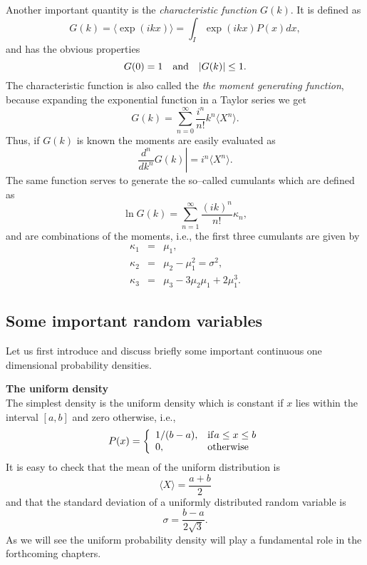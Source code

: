 Another important quantity is the {\em characteristic function} $G(k)$. It is 
defined as
\begin{equation}
G(k) = \langle \exp(ikx) \rangle = \int_I \exp(ikx) P(x) dx,
\end{equation}
and has the obvious properties
\begin{equation}
G(0) = 1 \quad {\rm and} \quad |G(k)| \le 1.
\end{equation}
The characteristic function is also called the {\em the moment 
generating function}, because expanding the exponential function 
in a Taylor series we get 
\begin{equation}
G(k) = \sum_{n=0}^{\infty} \frac{i^n}{n!} k^n 
      \langle X^n \rangle.
\end{equation}
Thus, if $G(k)$ is known the moments are easily evaluated as
\begin{equation}
\left. \frac{d^n}{dk^n}G(k) \right| = i^n \langle X^n \rangle.
\end{equation}
The same function serves to generate the so--called cumulants
which are defined as
\begin{equation}
\ln G(k) = \sum_{n=1}^{\infty} \frac{(ik)^n}{n!} \kappa_n,
\end{equation}
and are combinations of the moments, i.e., the first three 
cumulants are given by
\begin{eqnarray}
\kappa_1 &=& \mu_1, \\
\kappa_2 &=& \mu_2 - \mu_1^2 =\sigma^2, \\
\kappa_3 & = & \mu_3 - 3 \mu_2 \mu_1 + 2 \mu_1^3.
\end{eqnarray}

\subsection{Some important random variables}
Let us first introduce and discuss briefly some important 
continuous one dimensional probability densities.

{\bf The uniform density} \\
The simplest density is the uniform density which is constant if $x$
lies within the interval $[a,b]$ and zero otherwise, i.e.,
\begin{equation}
P(x) = \left\{ 
\begin{array}{ll}
1/(b-a), & {\rm if} a\le x \le b \\
0       , & {\rm otherwise}
\end{array}
\right.
\end{equation}
It is easy to check that the mean of the uniform distribution is
\begin{equation}
\langle X \rangle = \frac{a+b}{2}
\end{equation}
and that the standard deviation of a uniformly distributed random variable 
is
\begin{equation}
\sigma = \frac{b-a}{2\sqrt{3}}.
\end{equation}
As we will see the uniform probability density will play a 
fundamental role in the forthcoming chapters.

